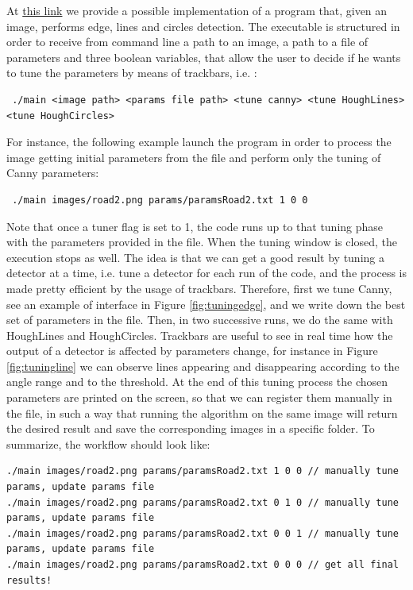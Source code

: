 \documentclass[twoside,onecolumn]{article}
\theoremstyle{definition}
\begin{document}
At \href{https://github.com/nicolezattarin/Computer-Vision/tree/main/edge_detection}{this link} we provide a possible implementation of a program that, given an image, performs edge, lines and circles detection. The executable is structured in order to receive from command line a path to an image, a path to a file of parameters and three boolean variables, that allow the user to decide if he wants to tune the parameters by means of trackbars, i.e. :
\begin{verbatim}
 ./main <image path> <params file path> <tune canny> <tune HoughLines> <tune HoughCircles>
\end{verbatim}
For instance, the following example launch the program in order to process the image  getting initial parameters from the file  and perform only the tuning of Canny parameters:
\begin{verbatim}
 ./main images/road2.png params/paramsRoad2.txt 1 0 0 
\end{verbatim}
Note that once a tuner flag is set to 1, the code runs up to that tuning phase with the parameters provided in the file. When the tuning window is closed, the execution stops as well.
The idea is that we can get a good result by tuning a detector at a time, i.e. tune a detector for each run of the code,  and the process is made pretty efficient by the usage of trackbars. Therefore, first we tune Canny, see an example of interface in Figure \ref{fig:tuningedge}, and we write down the best set of parameters in the  file. Then, in two successive runs, we do the same with HoughLines and HoughCircles. Trackbars are useful to see in real time how the output of a detector is affected by parameters change, for instance in Figure \ref{fig:tuningline} we can observe lines appearing and disappearing according to the angle range and to the threshold. At the end of this tuning process the chosen parameters are printed on the screen, so that we can register them manually in the  file, in such a way that running the algorithm on the same image will return the desired result and save the corresponding images in a specific folder. To summarize, the workflow should look like:
\begin{verbatim}
./main images/road2.png params/paramsRoad2.txt 1 0 0 // manually tune params, update params file
./main images/road2.png params/paramsRoad2.txt 0 1 0 // manually tune  params, update params file
./main images/road2.png params/paramsRoad2.txt 0 0 1 // manually tune params, update params file
./main images/road2.png params/paramsRoad2.txt 0 0 0 // get all final results!
\end{verbatim}
\end{document}
